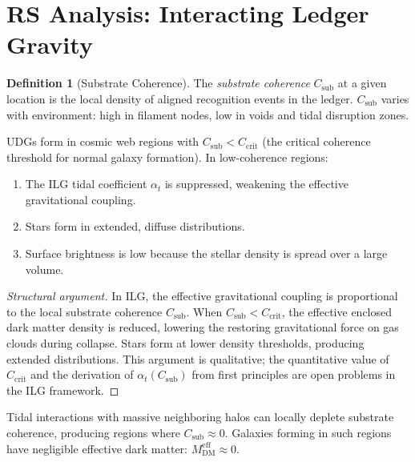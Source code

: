 \documentclass[12pt,a4paper]{article}
\theoremstyle{definition}
\newtheorem{definition}[theorem]{Definition}
\theoremstyle{remark}
\begin{document}
\section{RS Analysis: Interacting Ledger Gravity}
\label{sec:analysis}

\begin{definition}[Substrate Coherence]
The \emph{substrate coherence} $C_{\mathrm{sub}}$ at a given location
is the local density of aligned recognition events in the ledger.
$C_{\mathrm{sub}}$ varies with environment: high in filament nodes,
low in voids and tidal disruption zones.
\end{definition}

\begin{proposition}
\label{thm:udg}
UDGs form in cosmic web regions with $C_{\mathrm{sub}} <
C_{\mathrm{crit}}$ (the critical coherence threshold for normal
galaxy formation).  In low-coherence regions:
\begin{enumerate}[label=(\roman*),nosep]
  \item The ILG tidal coefficient $\alpha_t$ is suppressed, weakening
  the effective gravitational coupling.
  \item Stars form in extended, diffuse distributions.
  \item Surface brightness is low because the stellar density is
  spread over a large volume.
\end{enumerate}
\end{proposition}

\begin{proof}[Structural argument]
In ILG, the effective gravitational coupling is proportional to the
local substrate coherence $C_{\mathrm{sub}}$.  When $C_{\mathrm{sub}} <
C_{\mathrm{crit}}$, the effective enclosed dark matter density is
reduced, lowering the restoring gravitational force on gas clouds during
collapse.  Stars form at lower density thresholds, producing extended
distributions.  This argument is qualitative; the quantitative value
of $C_{\mathrm{crit}}$ and the derivation of $\alpha_t(C_{\mathrm{sub}})$
from first principles are open problems in the ILG framework.
\end{proof}

\begin{proposition}
\label{thm:df2}
Tidal interactions with massive neighboring halos can locally deplete
substrate coherence, producing regions where
$C_{\mathrm{sub}} \approx 0$.  Galaxies forming in such regions
have negligible effective dark matter:
$M_{\mathrm{DM}}^{\mathrm{eff}} \approx 0$.
\end{proposition}
\end{document}
